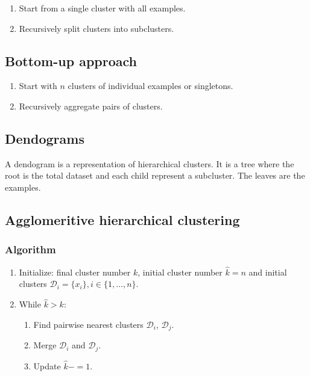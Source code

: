 	\begin{enumerate}
		\item Start from a single cluster with all examples.
		\item Recursively split clusters into subclusters.
	\end{enumerate}

	\subsection{Bottom-up approach}

	\begin{enumerate}
		\item Start with $n$ clusters of individual examples or singletons.
		\item Recursively aggregate pairs of clusters.
	\end{enumerate}

	\subsection{Dendograms}
	A dendogram is a representation of hierarchical clusters.
	It is a tree where the root is the total dataset and each child represent a subcluster.
	The leaves are the examples.

	\subsection{Agglomeritive hierarchical clustering}

		\subsubsection{Algorithm}

		\begin{enumerate}
			\item Initialize: final cluster number $k$, initial cluster number $\hat{k} = n$ and initial clusters $\mathcal{D}_i = \{x_i\},i\in\{1,\dots,n\}$.
			\item While $\hat{k}> k$:

				\begin{enumerate}
					\item Find pairwise nearest clusters $\mathcal{D}_i$, $\mathcal{D}_j$.
					\item Merge $\mathcal{D}_i$ and $\mathcal{D}_j$.
					\item Update $\hat{k} -= 1$.
				\end{enumerate}

		\end{enumerate}

